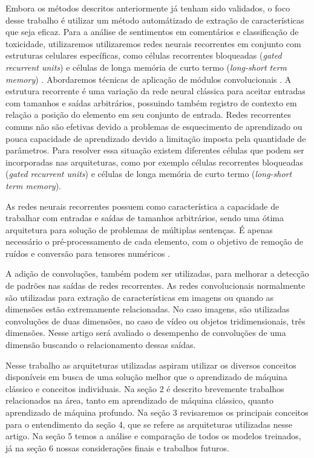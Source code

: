 \documentclass[12pt]{article}
\begin{document}
Embora os métodos descritos anteriormente já tenham sido validados, o foco desse trabalho é utilizar um método automátizado de extração de características que seja eficaz. Para a análise de sentimentos em comentários e classificação de toxicidade, utilizaremos utilizaremos redes neurais recorrentes em conjunto com estruturas celulares específicas, como células recorrentes bloqueadas (\textit{gated recurrent units}) \cite{DBLP:journals/corr/PascanuGCB13} e células de longa memória de curto termo (\textit{long-short term memory}) \cite{sep:97}. Abordaremos técnicas de aplicação de módulos convolucionais \cite{lecun:98}.
A estrutura recorrente é uma variação da rede neural clássica para aceitar entradas com tamanhos e saídas arbitrários, possuindo também registro de contexto em relação a posição do elemento em seu conjunto de entrada. Redes recorrentes comuns não são efetivas devido a problemas de esquecimento de aprendizado ou pouca capacidade de aprendizado devido a limitação imposta pela quantidade de parâmetros. Para resolver essa situação existem diferentes células que podem ser incorporadas nas arquiteturas, como por exemplo células recorrentes bloqueadas (\textit{gated recurrent units}) e células de longa memória de curto termo (\textit{long-short term memory}).

As redes neurais recorrentes possuem como característica a capacidade de trabalhar com entradas e saídas de tamanhos arbitrários, sendo uma ótima arquitetura para solução de problemas de múltiplas sentenças. É apenas necessário o pré-processamento de cada elemento, com o objetivo de remoção de ruídos e conversão para tensores numéricos \cite{karpathy:2015}.

A adição de convoluções, também podem ser utilizadas, para melhorar a detecção de padrões nas saídas de redes recorrentes. As redes convolucionais normalmente são utilizadas para extração de características em imagens \cite{lecun:98} ou quando as dimensões estão extremamente relacionadas. No caso imagens, são utilizadas convoluções de duas dimensões, no caso de vídeo ou objetos tridimensionais, três dimensões. Nesse artigo será avaliado o desempenho de convoluções de uma dimensão buscando o relacionamento dessas saídas.

Nesse trabalho as arquiteturas utilizadas aspiram utilizar os diversos conceitos disponíveis em busca de uma solução melhor que o aprendizado de máquina clássico e conceitos individuais. Na seção 2 é descrito brevemente trabalhos relacionados na área, tanto em aprendizado de máquina clássico, quanto aprendizado de máquina profundo. Na seção 3 revisaremos os principais conceitos para o entendimento da seção 4, que se refere as arquiteturas utilizadas nesse artigo. Na seção 5 temos a análise e comparação de todos os modelos treinados, já na seção 6 nossas considerações finais e trabalhos futuros.
\end{document}
